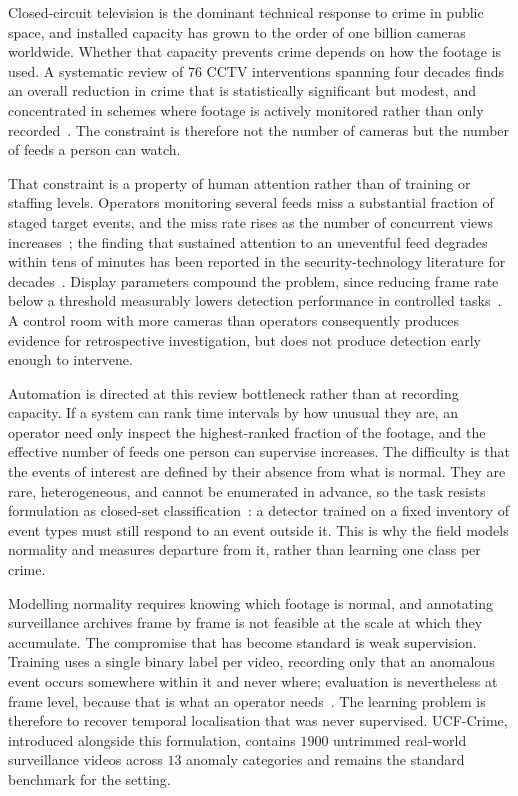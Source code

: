 \documentclass[11pt]{article}
\begin{document}
Closed-circuit television is the dominant technical response to crime in public
space, and installed capacity has grown to the order of one billion cameras
worldwide. Whether that capacity prevents crime depends on how the footage is
used. A systematic review of $76$ CCTV interventions spanning four decades finds
an overall reduction in crime that is statistically significant but
modest, and concentrated in schemes where footage is actively
monitored rather than only recorded~\citep{piza2019cctv}. The constraint is
therefore not the number of cameras but the number of feeds a person can watch.

That constraint is a property of human attention rather than of training or
staffing levels. Operators monitoring several feeds miss a substantial fraction
of staged target events, and the miss rate rises as the number of concurrent
views increases~\citep{sulman2008effective}; the finding that sustained attention
to an uneventful feed degrades within tens of minutes has been reported in the
security-technology literature for
decades~\citep{green1999appropriate}. Display parameters compound the
problem, since reducing frame rate below a threshold measurably lowers detection
performance in controlled tasks~\citep{keval2008cctv}. A control room with more
cameras than operators consequently produces evidence for retrospective
investigation, but does not produce detection early enough to intervene.

Automation is directed at this review bottleneck rather than at recording
capacity. If a system can rank time intervals by how unusual they are, an
operator need only inspect the highest-ranked fraction of the footage, and the
effective number of feeds one person can supervise increases. The difficulty is
that the events of interest are defined by their absence from what is normal.
They are rare, heterogeneous, and cannot be enumerated in advance, so the task
resists formulation as closed-set
classification~\citep{dee2008how,ramachandra2020survey,nayak2021comprehensive}: a
detector trained on a fixed inventory of event types must still respond to an
event outside it. This is why the field models normality and measures departure
from it, rather than learning one class per crime.

Modelling normality requires knowing which footage is normal, and annotating
surveillance archives frame by frame is not feasible at the scale at which they
accumulate. The compromise that has become standard is weak supervision. Training
uses a single binary label per video, recording only that an anomalous event
occurs somewhere within it and never where; evaluation is nevertheless at frame
level, because that is what an operator needs~\citep{sultani2018real}. The
learning problem is therefore to recover temporal localisation that was never
supervised. UCF-Crime, introduced alongside this formulation, contains $1900$
untrimmed real-world surveillance videos across $13$ anomaly categories and
remains the standard benchmark for the setting.
\end{document}
